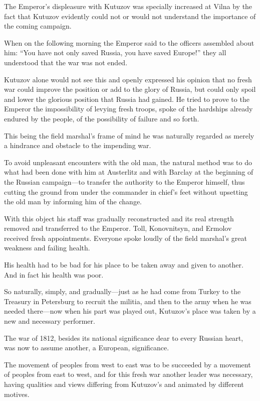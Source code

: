 The Emperor's displeasure with Kutuzov was specially increased at
Vilna by the fact that Kutuzov evidently could not or would not
understand the importance of the coming campaign.

When on the following morning the Emperor said to the officers
assembled about him: ``You have not only saved Russia, you have
saved Europe!'' they all understood that the war was not ended.

Kutuzov alone would not see this and openly expressed his opinion
that no fresh war could improve the position or add to the glory
of Russia, but could only spoil and lower the glorious position
that Russia had gained. He tried to prove to the Emperor the
impossibility of levying fresh troops, spoke of the hardships
already endured by the people, of the possibility of failure and
so forth.

This being the field marshal's frame of mind he was naturally
regarded as merely a hindrance and obstacle to the impending war.

To avoid unpleasant encounters with the old man, the natural
method was to do what had been done with him at Austerlitz and
with Barclay at the beginning of the Russian campaign---to
transfer the authority to the Emperor himself, thus cutting the
ground from under the commander in chief's feet without upsetting
the old man by informing him of the change.

With this object his staff was gradually reconstructed and its
real strength removed and transferred to the Emperor. Toll,
Konovnitsyn, and Ermolov received fresh appointments. Everyone
spoke loudly of the field marshal's great weakness and failing
health.

His health had to be bad for his place to be taken away and given
to another. And in fact his health was poor.

So naturally, simply, and gradually---just as he had come from
Turkey to the Treasury in Petersburg to recruit the militia, and
then to the army when he was needed there---now when his part was
played out, Kutuzov's place was taken by a new and necessary
performer.

The war of 1812, besides its national significance dear to every
Russian heart, was now to assume another, a European,
significance.

The movement of peoples from west to east was to be succeeded by
a movement of peoples from east to west, and for this fresh war
another leader was necessary, having qualities and views
differing from Kutuzov's and animated by different motives.

